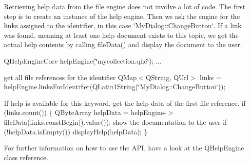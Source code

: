 Retrieving help data from the file engine does not involve a lot of code. The first step is to create an instance of the help engine. Then we ask the engine for the links assigned to the identifier, in this case \char`\"{}\-My\-Dialog\-::\-Change\-Button\char`\"{}. If a link was found, meaning at least one help document exists to this topic, we get the actual help contents by calling file\-Data() and display the document to the user.

Q\-Help\-Engine\-Core help\-Engine(\char`\"{}mycollection.\-qhc\char`\"{}); ...

get all file references for the identifier Q\-Map$<$\-Q\-String, Q\-Url$>$ links = help\-Engine.\-links\-For\-Identifier(Q\-Latin1\-String(\char`\"{}\-My\-Dialog\-::\-Change\-Button\char`\"{}));

If help is available for this keyword, get the help data of the first file reference. if (links.\-count()) \{ Q\-Byte\-Array help\-Data = help\-Engine-\/$>$file\-Data(links.\-const\-Begin().value()); show the documentation to the user if (!help\-Data.is\-Empty()) display\-Help(help\-Data); \}

For further information on how to use the A\-P\-I, have a look at the Q\-Help\-Engine class reference. 